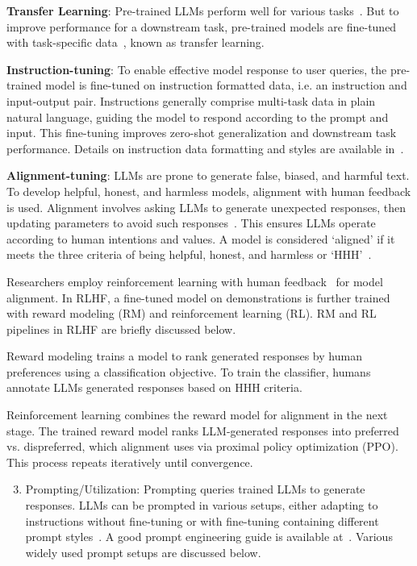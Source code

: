 \documentclass[a4paper,oneside]{book}
\begin{document}
\textbf{Transfer Learning}: Pre-trained LLMs perform well for various tasks~\cite{brown2020language, chowdhery2023palm}. But to improve performance for a downstream task, pre-trained models are fine-tuned with task-specific data~\cite{raffel2020exploring, xue2020mt5}, known as transfer learning.

\textbf{Instruction-tuning}: To enable effective model response to user queries, the pre-trained model is fine-tuned on instruction formatted data, i.e. an instruction and input-output pair. Instructions generally comprise multi-task data in plain natural language, guiding the model to respond according to the prompt and input. This fine-tuning improves zero-shot generalization and downstream task performance. Details on instruction data formatting and styles are available in~\cite{chung2022scaling, zhao2023survey, iyer2022opt}.

\textbf{Alignment-tuning}: LLMs are prone to generate false, biased, and harmful text. To develop helpful, honest, and harmless models, alignment with human feedback is used. Alignment involves asking LLMs to generate unexpected responses, then updating parameters to avoid such responses~\cite{ouyang2022training, touvron2023llama, sun2023principle}. This ensures LLMs operate according to human intentions and values. A model is considered `aligned' if it meets the three criteria of being helpful, honest, and harmless or `HHH'~\cite{askell2021general}.

Researchers employ reinforcement learning with human feedback~\cite{ziegler2019fine} for model alignment. In RLHF, a fine-tuned model on demonstrations is further trained with reward modeling (RM) and reinforcement learning (RL). RM and RL pipelines in RLHF are briefly discussed below.

Reward modeling trains a model to rank generated responses by human preferences using a classification objective. To train the classifier, humans annotate LLMs generated responses based on HHH criteria.

Reinforcement learning combines the reward model for alignment in the next stage. The trained reward model ranks LLM-generated responses into preferred vs. dispreferred, which alignment uses via proximal policy optimization (PPO). This process repeats iteratively until convergence.

\begin{enumerate}
    \setcounter{enumi}{2}
    \item Prompting/Utilization: Prompting queries trained LLMs to generate responses. LLMs can be prompted in various setups, either adapting to instructions without fine-tuning or with fine-tuning containing different prompt styles~\cite{chung2022scaling, kim2023cot, liu2023zero}. A good prompt engineering guide is available at~\cite{saravia2022prompt}. Various widely used prompt setups are discussed below.
\end{enumerate}
\end{document}
